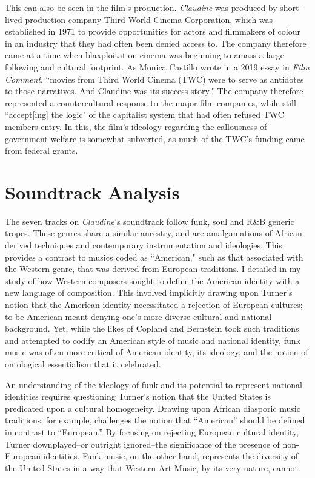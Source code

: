 This can also be seen in the film's production.
\textit{Claudine} was produced by short-lived production company Third World Cinema Corporation, which was established in 1971 to provide opportunities for actors and filmmakers of colour in an industry that they had often been denied access to.\autocite[][]{weiler_third_1971}
The company therefore came at a time when blaxploitation cinema was beginning to amass a large following and cultural footprint.
As Monica Castillo wrote in a 2019 essay in \textit{Film Comment}, ``movies from Third World Cinema (TWC) were to serve as antidotes to those narratives. And Claudine was its success story."\autocite[][]{castillo_divided_2019}
The company therefore represented a countercultural response to the major film companies, while still ``accept[ing] the logic" of the capitalist system that had often refused TWC members entry.\autocite[][121]{ryan_camera_1988}
In this, the film's ideology regarding the callousness of government welfare is somewhat subverted, as much of the TWC's funding came from federal grants.\autocite[][136-137]{lev_american_2010}



\section{Soundtrack Analysis}

The seven tracks on \textit{Claudine}'s soundtrack follow funk, soul and R\&B generic tropes.
These genres share a similar ancestry, and are amalgamations of African-derived techniques and contemporary instrumentation and ideologies.
This provides a contrast to musics coded as ``American," such as that associated with the Western genre, that was derived from European traditions.
I detailed in my study of \textcite{sherman_big_1971} how Western composers sought to define the American identity with a new language of composition.
This involved implicitly drawing upon Turner's notion that the American identity necessitated a rejection of European cultures; to be American meant denying one's more diverse cultural and national background.
Yet, while the likes of Copland and Bernstein took such traditions and attempted to codify an American style of music and national identity, funk music was often more critical of American identity, its ideology, and the notion of ontological essentialism that it celebrated.

An understanding of the ideology of funk and its potential to represent national identities requires questioning Turner's notion that the United States is predicated upon a cultural homogeneity.
Drawing upon African diasporic music traditions, for example, challenges the notion that ``American” should be defined in contrast to ``European.”
By focusing on rejecting European cultural identity, Turner downplayed–or outright ignored–the significance of the presence of non-European identities.
Funk music, on the other hand, represents the diversity of the United States in a way that Western Art Music, by its very nature, cannot.

